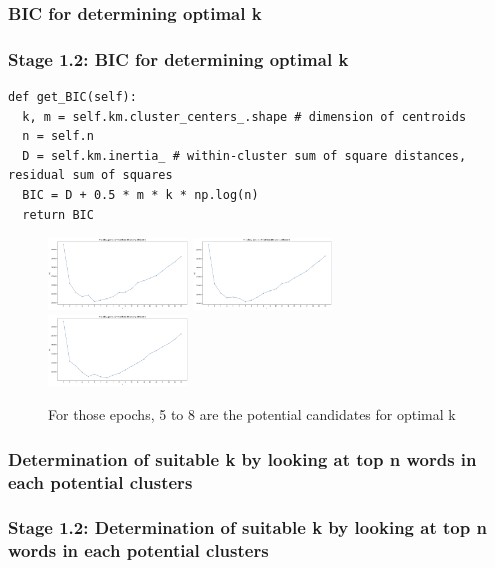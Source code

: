 \documentclass{tum-presentation}
\begin{document}
\subsubsection{BIC for determining optimal k}
\begin{frame}[fragile]
  \frametitle{Stage 1.2: BIC for determining optimal k}
  \begin{lstlisting}
def get_BIC(self):
  k, m = self.km.cluster_centers_.shape # dimension of centroids
  n = self.n
  D = self.km.inertia_ # within-cluster sum of square distances, residual sum of squares 
  BIC = D + 0.5 * m * k * np.log(n)
  return BIC
  \end{lstlisting}
  \begin{center}
    \begin{figure}[t]
      \includegraphics[width=0.33\textwidth]{images/BIC-1.png}
      \includegraphics[width=0.33\textwidth]{images/BIC-2.png}
      \includegraphics[width=0.33\textwidth]{images/BIC-3.png}
      \caption{For those epochs, 5 to 8 are the potential candidates for optimal k}
    \end{figure}
  \end{center}
\end{frame}
\subsubsection{Determination of suitable k by looking at top n words in each potential clusters}
\begin{frame}[fragile]
  \frametitle{Stage 1.2: Determination of suitable k by looking at top n words in each potential clusters}
  \end{frame}
\end{document}
